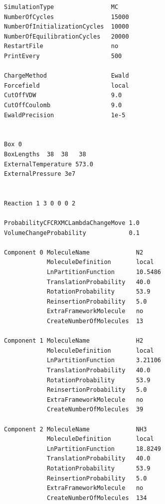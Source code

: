 \begin{verbatim}
SimulationType                MC
NumberOfCycles                15000
NumberOfInitializationCycles  10000
NumberOfEquilibrationCycles   20000
RestartFile                   no
PrintEvery                    500

ChargeMethod                  Ewald
Forcefield                    local
CutOffVDW                     9.0
CutOffCoulomb                 9.0
EwaldPrecision                1e-5


Box 0
BoxLengths  38  38   38
ExternalTemperature 573.0
ExternalPressure 3e7


Reaction 1 3 0 0 0 2

ProbabilityCFCRXMCLambdaChangeMove 1.0
VolumeChangeProbability            0.1

Component 0 MoleculeName             N2
            MoleculeDefinition       local
            LnPartitionFunction      10.5486
            TranslationProbability   40.0
            RotationProbability      53.9
            ReinsertionProbability   5.0
            ExtraFrameworkMolecule   no
            CreateNumberOfMolecules  13

Component 1 MoleculeName             H2
            MoleculeDefinition       local
            LnPartitionFunction      3.21106
            TranslationProbability   40.0
            RotationProbability      53.9
            ReinsertionProbability   5.0
            ExtraFrameworkMolecule   no
            CreateNumberOfMolecules  39

Component 2 MoleculeName             NH3
            MoleculeDefinition       local
            LnPartitionFunction      18.8249
            TranslationProbability   40.0
            RotationProbability      53.9
            ReinsertionProbability   5.0
            ExtraFrameworkMolecule   no
            CreateNumberOfMolecules  134
\end{verbatim}


